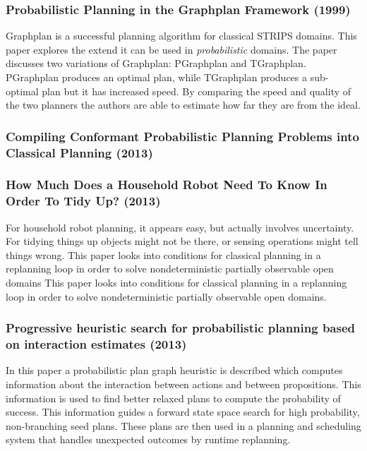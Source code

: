 \documentclass[runningheads,a4paper]{llncs}
\begin{document}
\subsubsection{Probabilistic Planning in the Graphplan Framework (1999)~\cite{Blum99probabilisticplanning}}

Graphplan is a successful planning algorithm for classical STRIPS domains. This
paper explores the extend it can be used in \emph{probabilistic} domains. The
paper discusses two variations of Graphplan: PGraphplan and TGraphplan.
PGraphplan produces an optimal plan, while TGraphplan produces a sub-optimal
plan but it has increased speed. By comparing the speed and quality of the
two planners the authors are able to estimate how far they are from the ideal.

\subsubsection{Compiling Conformant Probabilistic Planning Problems into Classical Planning (2013)~\cite{taig2013conformant}}

\subsubsection{How Much Does a Household Robot Need To Know In Order To Tidy Up? (2013)~\cite{nebel2013much}}

For household robot planning, it appears easy, but actually involves
uncertainty. For tidying things up objects might not be there, or sensing
operations might tell things wrong. This paper looks into conditions for
classical planning in a replanning loop in order to solve nondeterministic
partially observable open domains This paper looks into conditions for
classical planning in a replanning loop in order to solve nondeterministic
partially observable open domains.

\subsubsection{Progressive heuristic search for probabilistic planning based on interaction estimates (2013)~\cite{martin2013progressive}}

In this paper a probabilistic plan graph heuristic is described which computes
information about the interaction between actions and between propositions.
This information is used to find better relaxed plans to compute the
probability of success. This information guides a forward state space search
for high probability, non-branching seed plans. These plans are then used in
a planning and scheduling system that handles unexpected outcomes by runtime
replanning.
\end{document}

